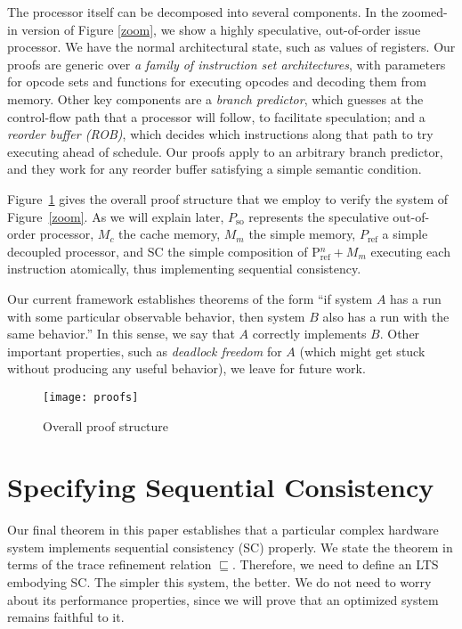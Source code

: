The processor itself can be decomposed into several components. In the zoomed-in
version of Figure \ref{zoom}, we show a highly speculative, out-of-order
issue processor. We have the normal architectural state, such as values of
registers.  Our proofs are generic over \emph{a family of instruction set
architectures}, with parameters for opcode sets and functions for executing
opcodes and decoding them from memory.  Other key components are a \emph{branch
predictor}, which guesses at the control-flow path that a processor will
follow, to facilitate speculation; and a \emph{reorder buffer (ROB)}, which
decides which instructions along that path to try executing ahead of schedule.
Our proofs apply to an arbitrary branch predictor, and they work for any
reorder buffer satisfying a simple semantic condition.

Figure~\ref{proofs} gives the overall proof structure that we employ to verify
the system of Figure~\ref{zoom}. As we will explain later, $P_\text{so}$
represents the speculative out-of-order processor, $M_c$ the cache memory,
$M_m$ the simple memory, $P_\text{ref}$ a simple decoupled processor, and
SC the simple composition of P$^n_\text{ref}+ M_m$ executing each
instruction atomically, thus implementing sequential consistency.

Our current framework establishes theorems of the form ``if system $A$ has a run
with some particular observable behavior, then system $B$ also has a run with
the same behavior.''  In this sense, we say that $A$ correctly implements $B$.
Other important properties, such as \emph{deadlock freedom} for $A$ (which
might get stuck without producing any useful behavior), we leave for future
work.

\begin{figure}
\texttt{[image: proofs]}
\caption{Overall proof structure}
\label{proofs}
\end{figure}

\section{Specifying Sequential Consistency}\label{sec:sc}

Our final theorem in this paper establishes that a particular complex hardware
system implements sequential consistency (SC) properly.  We state the theorem
in terms of the trace refinement relation $\sqsubseteq$.
Therefore, we need to define an LTS embodying SC.  The simpler this
system, the better.  We do not need to worry about its performance properties,
since we will prove that an optimized system remains faithful to it.

